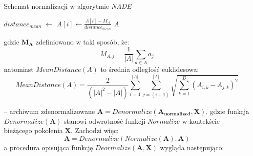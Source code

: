 \documentclass[12pt,a4paper]{report}
\begin{document}
{{{{{{{\begin{description}
\begin{algorithm}[H]
\caption{Schemat normalizacji w algorytmie \emph{NADE}}
\label{algorithm:ea}
\begin{algorithmic}[1]
	\State $distance_{mean}$ $\gets$ 
        \State $A[i] \gets \frac{A[i] - M_{A}}{distance_{mean}}$
    \EndFor
    \State \Return $A$
\EndFunction
\end{algorithmic}
\end{algorithm}
gdzie $\mathbf{M_{A}}$ zdefiniowano w taki sposób, że:
\begin{equation}
M_{A,j} = \frac{1}{|A|}\sum_{a \in A}{a_j}
\end{equation}
natomiast $MeanDistance(A)$ to średnia odległość euklidesowa:
\begin{equation}
MeanDistance(A) = \frac{2}{(|A|^2 - |A|)}\sum_{i = 1}^{|A|}{\sum_{j = (i+1)}^{|A|}{\sqrt{\sum_{k = 1}^{D}{(A_{i,k} - A_{j,k})^2}}}}
\end{equation}
\item[Denormalizacji] -- archiwum zdenormalizowane $\mathbf{A} = Denormalize(\mathbf{A_{normalized}}, \mathbf{X})$, gdzie funkcja $Denormalize(\mathbf{A})$ stanowi odwrotność funkcji $Normalize$ w kontekście bieżącego pokolenia $\mathbf{X}$. Zachodzi więc:
\begin{equation}
\mathbf{A} = Denormalize(Normalize(\mathbf{A}), \mathbf{A})
\end{equation}
a procedura opisująca funkcję $Deormalize(\mathbf{A}, \mathbf{X})$ wygląda następująco:
\end{description}

}}}}}}}
\end{document}
